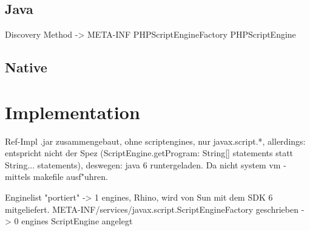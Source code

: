 \subsection{Java}
\label{sec:chap1:design:java}
Discovery Method -> META-INF
PHPScriptEngineFactory
PHPScriptEngine

\subsection{Native}
\label{sec:chap1:design:native}


\section{Implementation}
\label{sec:chap1:impl}

Ref-Impl .jar zusammengebaut, ohne scriptengines, nur javax.script.*, allerdings: entspricht nicht der Spez 
(ScriptEngine.getProgram: String[] statements statt String... statements), deswegen: java 6 runtergeladen.
Da nicht system vm - mittels makefile ausf"uhren.

Enginelist "portiert" -> 1 engines, Rhino, wird von Sun mit dem SDK 6 mitgeliefert.
META-INF/services/javax.script.ScriptEngineFactory geschrieben -> 0 engines
ScriptEngine angelegt




